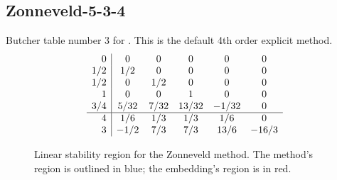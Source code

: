 \documentclass[letterpaper,10pt,english]{sphinxmanual}
\begin{document}
\subsection{Zonneveld-5-3-4}
\label{Butcher:butcher-zonneveld}\label{Butcher:zonneveld-5-3-4}
Butcher table number 3
for {\hyperref[c_interface/User_callable:ARKodeSetERKTableNum]{}}.  This is
the default 4th order explicit method.
\begin{gather}
\begin{split}\begin{array}{r|ccccc}
    0 & 0 & 0 & 0 & 0 & 0 \\
  1/2 & 1/2 & 0 & 0 & 0 & 0 \\
  1/2 & 0 & 1/2 & 0 & 0 & 0 \\
    1 & 0 & 0 & 1 & 0 & 0 \\
  3/4 & 5/32 & 7/32 & 13/32 & -1/32 & 0 \\
  \hline
  4 & 1/6 & 1/3 & 1/3 & 1/6 & 0 \\
  3 & -1/2 & 7/3 & 7/3 & 13/6 & -16/3
\end{array}\end{split}\notag
\end{gather}\begin{figure}[htbp]
\centering
\capstart

\caption{Linear stability region for the Zonneveld method.  The method's
region is outlined in blue; the embedding's region is in red.}\end{figure}
\end{document}
